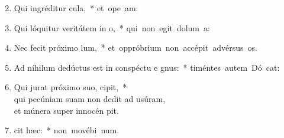 \begin{flushleft}
\begin{enumerate}[leftmargin=*]
\setcounter{enumi}{1}

\item Qui ingréditur  cula,~* \mbox{et ope am:}
\item Qui lóquitur veritátem in  o,~* \mbox{qui non egit dolum   a:}
\item Nec fecit próximo  lum,~* \mbox{et oppróbrium non accépit advérsus  os.}
\item Ad níhilum dedúctus est in conspéctu e gnus:~* \mbox{timéntes autem Dó cat:}
\item Qui jurat próximo suo,   cipit,~* \\qui pecúniam suam non dedit ad usúram, \\et múnera super innocén  pit.
\item {} cit hæc:~* \mbox{non movébi  num.}

\end{enumerate}
\end{flushleft}

